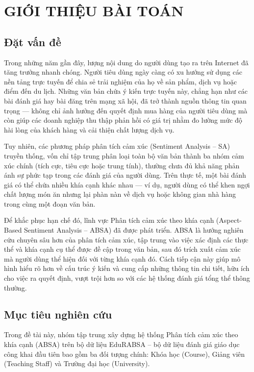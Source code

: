 \documentclass[12pt,a4paper]{report}
\begin{document}

\tableofcontents
\newpage

\chapter{GIỚI THIỆU BÀI TOÁN}
\section{Đặt vấn đề}
Trong những năm gần đây, lượng nội dung do người dùng tạo ra trên Internet đã tăng trưởng nhanh chóng. Người tiêu dùng ngày càng có xu hướng sử dụng các nền tảng trực tuyến để chia sẻ trải nghiệm của họ về sản phẩm, dịch vụ hoặc điểm đến du lịch. Những văn bản chứa ý kiến trực tuyến này, chẳng hạn như các bài đánh giá hay bài đăng trên mạng xã hội, đã trở thành nguồn thông tin quan trọng — không chỉ ảnh hưởng đến quyết định mua hàng của người tiêu dùng mà còn giúp các doanh nghiệp thu thập phản hồi có giá trị nhằm đo lường mức độ hài lòng của khách hàng và cải thiện chất lượng dịch vụ.

Tuy nhiên, các phương pháp phân tích cảm xúc (Sentiment Analysis – SA) truyền thống, vốn chỉ tập trung phân loại toàn bộ văn bản thành ba nhóm cảm xúc chính (tích cực, tiêu cực hoặc trung tính), thường chưa đủ khả năng phản ánh sự phức tạp trong các đánh giá của người dùng. Trên thực tế, một bài đánh giá có thể chứa nhiều khía cạnh khác nhau — ví dụ, người dùng có thể khen ngợi chất lượng món ăn nhưng lại phàn nàn về dịch vụ hoặc không gian nhà hàng trong cùng một đoạn văn bản.

Để khắc phục hạn chế đó, lĩnh vực Phân tích cảm xúc theo khía cạnh (Aspect-Based Sentiment Analysis – ABSA) đã được phát triển. ABSA là hướng nghiên cứu chuyên sâu hơn của phân tích cảm xúc, tập trung vào việc xác định các thực thể và khía cạnh cụ thể được đề cập trong văn bản, sau đó trích xuất cảm xúc mà người dùng thể hiện đối với từng khía cạnh đó. Cách tiếp cận này giúp mô hình hiểu rõ hơn về cấu trúc ý kiến và cung cấp những thông tin chi tiết, hữu ích cho việc ra quyết định, vượt trội hơn so với các hệ thống đánh giá tổng thể thông thường.

\section{Mục tiêu nghiên cứu}
Trong đề tài này, nhóm tập trung xây dựng hệ thống Phân tích cảm xúc theo khía cạnh (ABSA) trên bộ dữ liệu EduRABSA – bộ dữ liệu đánh giá giáo dục công khai đầu tiên bao gồm ba đối tượng chính: Khóa học (Course), Giảng viên (Teaching Staff) và Trường đại học (University).
\end{document}
